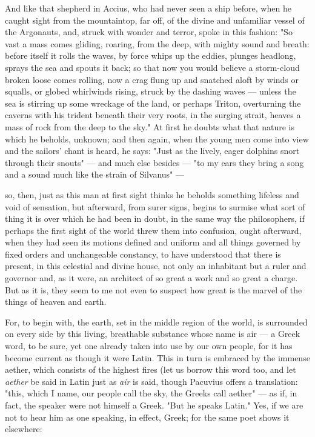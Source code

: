  And like that shepherd in Accius, who had never seen a ship before, when he caught sight from the mountaintop, far off, of the divine and unfamiliar vessel of the Argonauts, and, struck with wonder and terror, spoke in this fashion: "So vast a mass comes gliding, roaring, from the deep, with mighty sound and breath: before itself it rolls the waves, by force whips up the eddies, plunges headlong, sprays the sea and spouts it back; so that now you would believe a storm-cloud broken loose comes rolling, now a crag flung up and snatched aloft by winds or squalls, or globed whirlwinds rising, struck by the dashing waves — unless the sea is stirring up some wreckage of the land, or perhaps Triton, overturning the caverns with his trident beneath their very roots, in the surging strait, heaves a mass of rock from the deep to the sky." At first he doubts what that nature is which he beholds, unknown; and then again, when the young men come into view and the sailors' chant is heard, he says: "Just as the lively, eager dolphins snort through their snouts" — and much else besides — "to my ears they bring a song and a sound much like the strain of Silvanus" —

 so, then, just as this man at first sight thinks he beholds something lifeless and void of sensation, but afterward, from surer signs, begins to surmise what sort of thing it is over which he had been in doubt, in the same way the philosophers, if perhaps the first sight of the world threw them into confusion, ought afterward, when they had seen its motions defined and uniform and all things governed by fixed orders and unchangeable constancy, to have understood that there is present, in this celestial and divine house, not only an inhabitant but a ruler and governor and, as it were, an architect of so great a work and so great a charge. But as it is, they seem to me not even to suspect how great is the marvel of the things of heaven and earth.

 For, to begin with, the earth, set in the middle region of the world, is surrounded on every side by this living, breathable substance whose name is air — a Greek word, to be sure, yet one already taken into use by our own people, for it has become current as though it were Latin. This in turn is embraced by the immense aether, which consists of the highest fires (let us borrow this word too, and let \textit{aether} be said in Latin just as \textit{air} is said, though Pacuvius offers a translation: "this, which I name, our people call the sky, the Greeks call aether" — as if, in fact, the speaker were not himself a Greek. "But he speaks Latin." Yes, if we are not to hear him as one speaking, in effect, Greek; for the same poet shows it elsewhere:

